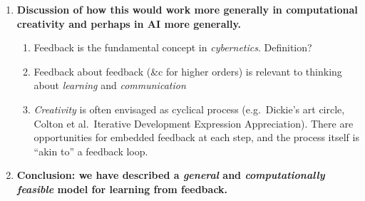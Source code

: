 \documentclass[letter]{article}
\newcommand{\dec}[1]{\raisebox{.2ex}{$\star$}#1\raisebox{.2ex}{$\star$}}
\begin{document}
{\begin{enumerate}[start=0,label=\textbf{\arabic*}]
\item \textbf{Discussion of how this would work more generally in
  computational creativity and perhaps in AI more generally.}
\begin{enumerate}
\item Feedback is the fundamental concept in \emph{cybernetics}.  \dec{Definition?}
\item Feedback about feedback (\&c for higher orders) is relevant to thinking about \emph{learning} and \emph{communication}
\item \emph{Creativity} is often envisaged as cyclical process (e.g.~Dickie's
  art circle, Colton et al.~Iterative
  Development Expression Appreciation).  There are opportunities for
  embedded feedback at each step, and the process itself is ``akin
  to'' a feedback loop.
\end{enumerate}
\item \textbf{Conclusion: we have described a \emph{general} and \emph{computationally feasible} model for learning from feedback.}
\end{enumerate}
}





\end{document}

